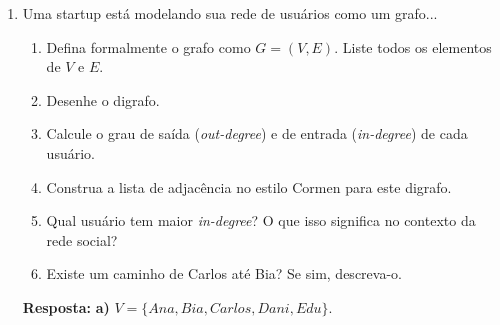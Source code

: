 \documentclass[12pt]{article}
\newcommand{\quadro}[1]{\vspace{0.2cm}\begin{tcolorbox}[colback=green!5, colframe=forestgreen, boxrule=0.5pt, arc=0pt] \textbf{Resposta:} #1 \end{tcolorbox}}
\begin{document}
\begin{enumerate}[label=\arabic*), leftmargin=1.5cm, itemsep=0.8cm]
\item Uma startup está modelando sua rede de usuários como um grafo...
\begin{enumerate}[label=\alph*)]
    \item Defina formalmente o grafo como $G = (V, E)$. Liste todos os elementos de $V$ e $E$.
    \item Desenhe o digrafo.
    \item Calcule o grau de saída (\textit{out-degree}) e de entrada (\textit{in-degree}) de cada usuário.
    \item Construa a lista de adjacência no estilo Cormen para este digrafo.
    \item Qual usuário tem maior \textit{in-degree}? O que isso significa no contexto da rede social?
    \item Existe um caminho de Carlos até Bia? Se sim, descreva-o.
\end{enumerate} 
\quadro{
\textbf{a)} $V = \{Ana, Bia, Carlos, Dani, Edu\}$. \\ 

}
\end{enumerate}
\end{document}
